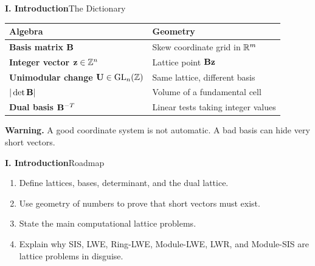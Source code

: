 \begin{frame}{\textbf{I. Introduction}}{The Dictionary}
\small
\begin{center}
\renewcommand{\arraystretch}{1.28}
\begin{tabular}{>{\bfseries}p{}p{}}
\toprule
Algebra & Geometry \\
\midrule
Basis matrix $\mathbf{B}$ & Skew coordinate grid in $\mathbb{R}^m$ \\
Integer vector $\mathbf{z}\in\mathbb{Z}^n$ & Lattice point $\mathbf{B}\mathbf{z}$ \\
Unimodular change $\mathbf{U}\in\operatorname{GL}_n(\mathbb{Z})$ & Same lattice, different basis \\
$|\det \mathbf{B}|$ & Volume of a fundamental cell \\
Dual basis $\mathbf{B}^{-T}$ & Linear tests taking integer values \\
\bottomrule
\end{tabular}
\end{center}
\vfill
\textbf{\color{red}Warning.}\; A good coordinate system is not automatic. A bad basis can hide very short vectors.
\end{frame}

\begin{frame}{\textbf{I. Introduction}}{Roadmap}
\small
\begin{enumerate}
  \item Define lattices, bases, determinant, and the dual lattice.
  \item Use geometry of numbers to prove that short vectors must exist.
  \item State the main computational lattice problems.
  \item Explain why SIS, LWE, Ring-LWE, Module-LWE, LWR, and Module-SIS are lattice problems in disguise.
\end{enumerate}
\bigskip
\begin{center}
\end{center}
\end{frame}
